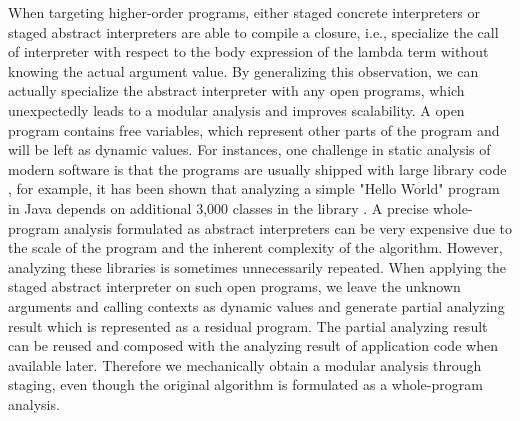 \iffalse
When staging a concrete interpreter, the programmers need to distinguish 
static and dynamic values --- the given program to be executed by the 
interpreter is classified as static because it is known at compile-time, 
and the inputs to that program are dynamic.  However, when staging an 
abstract interpreter, this distinction does not exist anymore. Because the 
abstract interpreter instantiates all the inputs as some form of abstract 
values, which are usually top elements in their abstract domains and are 
also statically known. 
Then what is the point of staging if there is no such distinction?
A surprising by-product of thinking about this question is to realize that 
we can apply the staged abstract interpreter on \textit{open} programs, and
the free variables representing other parts of the program (e.g., libraries) 
are dynamic inputs, therefore we obtain a modular analysis through staging, 
mechanically. 
\note{TR: I don't understand this. The program structure is static, the abstract values are still dynamic, no? They change in every iteration of the fixpoint algorithm} 
\note{TR: why is it a big deal. On Closed programs we obtain a constant factor, but modular analysis has different asymptotics}
\fi

When targeting higher-order programs, either staged concrete interpreters or staged abstract interpreters
are able to compile a closure, i.e., specialize the call of interpreter with respect to the body
expression of the lambda term without knowing the actual argument value. By generalizing this observation,
we can actually specialize the abstract interpreter with any open programs, 
which unexpectedly leads to a modular analysis and improves scalability.
A open program contains free variables, which represent other parts of the program and will be left
as dynamic values.
For instances, one challenge in static analysis of modern software is that the programs are usually 
shipped with large library code \cite{toman_et_al:LIPIcs:2017:7121}, for example, it has been shown that 
analyzing a simple "Hello World" program in Java depends on additional 3,000 classes in the library 
\cite{DBLP:conf/oopsla/KulkarniMZN16}.
A precise whole-program analysis formulated as abstract interpreters can be very expensive
due to the scale of the program and the inherent complexity of the algorithm.
However, analyzing these libraries is sometimes unnecessarily repeated.
When applying the staged abstract interpreter on such open programs, we leave the unknown arguments and 
calling contexts as dynamic values and generate partial analyzing result which is 
represented as a residual program. The partial analyzing result can be reused and composed with the 
analyzing result of application code when available later. Therefore we mechanically obtain a modular
analysis through staging, even though the original algorithm is formulated as a whole-program analysis.

